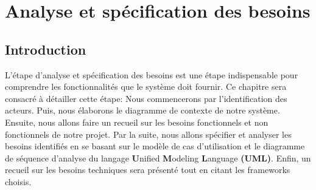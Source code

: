\vfill 
\chapter{Analyse et spécification des besoins}
\label{chap:analyse-specification-besoins}
\mtcaddchapter
\section*{Introduction}
\justifying
L’étape d’analyse et spécification des besoins est une étape indispensable pour comprendre les fonctionnalités que le système doit fournir. Ce chapitre sera consacré à détailler cette étape: Nous commencerons par l’identification des acteurs. Puis, nous élaborons le diagramme de contexte de notre système. Ensuite, nous allons faire un recueil sur  les besoins fonctionnels et non fonctionnels de notre projet. Par la suite, nous allons spécifier et analyser les besoins identifiés en se basant sur le modèle de cas d’utilisation et le diagramme de séquence d'analyse du langage  \textbf{U}nified  \textbf{M}odeling  \textbf{L}anguage \textbf{(UML)}. Enfin, un recueil sur les besoins techniques sera présenté tout en citant les frameworks choisis.


